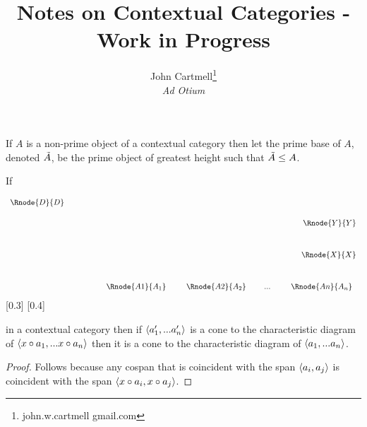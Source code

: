 \documentclass[10pt,a4paper]{scrartcl}
\title{Notes on Contextual Categories - Work in Progress}
\author{John Cartmell\footnote{john.w.cartmell gmail.com}\\ \normalsize{\textit{Ad Otium}}}
\begin{document}
\maketitle


\begin{definition}
If $A$ is a non-prime object of a contextual category \ccat then let the prime base of $A$, denoted $\tilde{A}$,  be the 
prime object of \ccat greatest height such that $\tilde{A} \leq A$.
\end{definition}

\begin{lemma}
If 
\begin{center}
\begin{displaymath}
\begin{array}{c p{1cm} r  }
\Rnode{D}{D} \\[0.5cm]
&&\Rnode{Y}{Y}\\[1.0cm]
&&\Rnode{X}{X}\\[1.0cm]
&&\begin{array}{c p{0.2cm} c p{0.1cm}c p{0.2cm} c}
\Rnode{A1}{A_1}& & \Rnode{A2}{A_2}&   & ... & & \Rnode{An}{A_n}
\end{array}                             
\end{array} 
\end{displaymath}
[0.3]
[0.4]

\end{center}

in a contextual category \ccat then if $\langle a'_1,...a'_n\rangle$ is a cone to the characteristic diagram 
of $\langle x \circ a_1,... x \circ a_n\rangle$ then it is a cone to the characteristic diagram
of $\langle a_1,... a_n\rangle$.
\end{lemma}
\begin{proof}
Follows because any cospan that is coincident with the span $\langle a_i,a_j\rangle$
is coincident with the span $\langle x \circ a_i, x \circ a_j\rangle$.
\end{proof}
\end{document}
